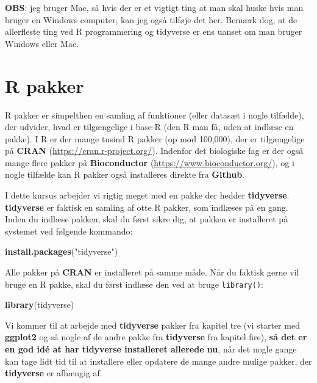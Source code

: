 \documentclass[
]{book}
\newenvironment{Shaded}{\begin{snugshade}}{\end{snugshade}}
\newcommand{\FunctionTok}[1]{\textcolor[rgb]{0.27,0.27,0.27}{\textbf{#1}}}
\newcommand{\NormalTok}[1]{#1}
\newcommand{\StringTok}[1]{\textcolor[rgb]{0.5,0.5,0.5}{#1}}
\begin{document}
\textbf{OBS}: jeg bruger Mac, så hvis der er et vigtigt ting at man skal huske hvis man bruger en Windows computer, kan jeg også tilføje det her. Bemærk dog, at de allerfleste ting ved R programmering og tidyverse er ens uanset om man bruger Windows eller Mac.

\section{R pakker}\label{r-pakker}

R pakker er simpelthen en samling af funktioner (eller datasæt i nogle tilfælde), der udvider, hvad er tilgængelige i base-R (den R man få, uden at indlæse en pakke). I R er der mange tusind R pakker (op mod 100,000), der er tilgængelige på \textbf{CRAN} (\url{https://cran.r-project.org/}). Indenfor det biologiske fag er der også mange flere pakker på \textbf{Bioconductor} (\url{https://www.bioconductor.org/}), og i nogle tilfælde kan R pakker også installeres direkte fra \textbf{Github}.

I dette kursus arbejder vi rigtig meget med en pakke der hedder \textbf{tidyverse}. \textbf{tidyverse} er faktisk en samling af otte R pakker, som indlæses på en gang. Inden du indlæse pakken, skal du først sikre dig, at pakken er installeret på systemet ved følgende kommando:

\begin{Shaded}
\begin{Highlighting}[]
\FunctionTok{install.packages}\NormalTok{(}\StringTok{"tidyverse"}\NormalTok{)}
\end{Highlighting}
\end{Shaded}

Alle pakker på \textbf{CRAN} er installeret på samme måde. Når du faktisk gerne vil bruge en R pakke, skal du først indlæse den ved at bruge \texttt{library()}:

\begin{Shaded}
\begin{Highlighting}[]
\FunctionTok{library}\NormalTok{(tidyverse)}
\end{Highlighting}
\end{Shaded}

Vi kommer til at arbejde med \textbf{tidyverse} pakker fra kapitel tre (vi starter med \textbf{ggplot2} og så nogle af de andre pakke fra \textbf{tidyverse} fra kapitel fire), \textbf{så det er en god idé at har tidyverse installeret allerede nu}, når det nogle gange kan tage lidt tid til at installere eller opdatere de mange andre mulige pakker, der \textbf{tidyverse} er afhængig af.
\end{document}
